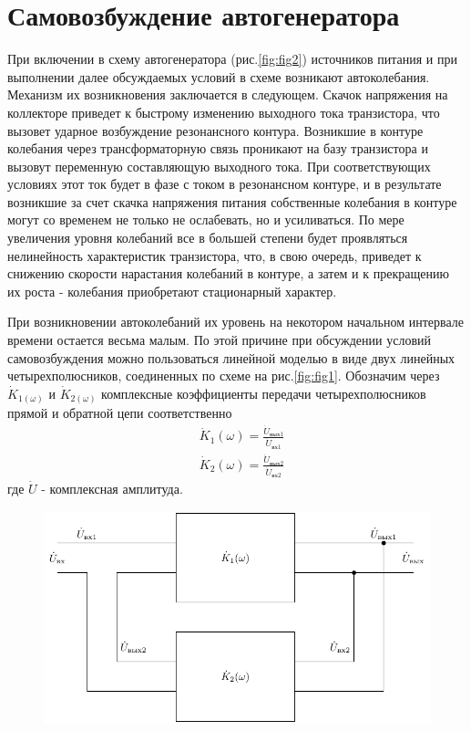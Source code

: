 \section{Самовозбуждение автогенератора}
При включении в схему автогенератора (рис.\ref{fig:fig2}) источников питания и при выполнении далее обсуждаемых условий в схеме возникают автоколебания. Механизм их возникновения заключается в следующем. Скачок напряжения на коллекторе приведет к быстрому изменению выходного тока транзистора, что вызовет ударное возбуждение резонансного контура. Возникшие в контуре колебания через трансформаторную связь проникают на базу транзистора и вызовут переменную составляющую выходного тока. При соответствующих условиях этот ток будет в фазе с током в резонансном контуре, и в результате возникшие за счет скачка напряжения питания собственные колебания в контуре могут со временем не только не ослабевать, но и усиливаться. По мере увеличения уровня колебаний все в большей степени будет проявляться нелинейность характеристик транзистора, что, в свою очередь, приведет к снижению скорости нарастания колебаний в контуре, а затем и к прекращению их роста - колебания приобретают стационарный характер.

При возникновении автоколебаний их уровень на некотором начальном интервале времени остается весьма малым. По этой причине при обсуждении условий самовозбуждения можно пользоваться линейной моделью в виде двух линейных четырехполюсников, соединенных по схеме на рис.\ref{fig:fig1}. Обозначим через $\dot{K}_{1(\omega)}$ и $\dot{K}_{2(\omega)}$ комплексные коэффициенты передачи четырехполюсников прямой и обратной цепи соответственно
\begin{equation*}
\begin{aligned}
&\dot{K}_1(\omega)=\frac{\dot{U}_{\text{вых}1}}{\dot{U}_{\text{вх}1}} \\
&\dot{K}_2(\omega)=\frac{\dot{U}_{\text{вых}2}}{\dot{U}_{\text{вх}2}} 
\end{aligned}
\end{equation*}
где $\dot{U}$ - комплексная амплитуда.

\begin{figure}[h]
	\centering
	\includegraphics[width=0.6\linewidth]{circuit/two.pdf}
	\caption{}
	\label{fig:fig3}
\end{figure}

